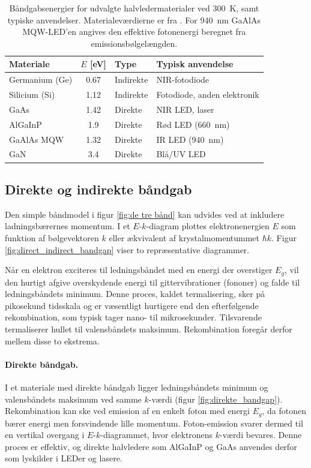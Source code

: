 \begin{table}[h]
\centering
\caption{Båndgabsenergier for udvalgte halvledermaterialer ved 
\SI{300}{K}, samt typiske anvendelser. Materialeværdierne er fra 
\cite[Tabel~16.3-1]{Saleh2007}. For \SI{940}{nm} GaAlAs MQW-LED'en angives den effektive fotonenergi beregnet fra emissionsbølgelængden.}
\label{tab:faststoffer}
\begin{tabular}{@{}lSll@{}}
\toprule
Materiale & {$E$ [eV]} & Type & Typisk anvendelse \\
\midrule
Germanium (Ge)  & 0.67 & Indirekte & NIR-fotodiode \\
Silicium (Si)   & 1.12 & Indirekte & Fotodiode, anden elektronik \\
GaAs            & 1.42 & Direkte   & NIR LED, laser \\
AlGaInP         & 1.9  & Direkte   & Rød LED (\SI{660}{nm}) \\
GaAlAs MQW      & 1.32 & Direkte   & IR LED (\SI{940}{nm}) \\
GaN             & 3.4  & Direkte   & Blå/UV LED \\
\bottomrule
\end{tabular}
\end{table}

\subsection{Direkte og indirekte båndgab}
\label{subsec:direkte_indirekte}

Den simple båndmodel i figur \ref{fig:de tre bånd} kan udvides ved at inkludere ladningsbærernes momentum. I et $E$-$k$-diagram plottes elektronenergien $E$ som funktion af bølgevektoren $k$ eller ækvivalent af krystalmomentummet $\hbar k$. Figur \ref{fig:direct_indirect_bandgap} viser to repræsentative diagrammer.

Når en elektron exciteres til ledningsbåndet med en energi der overstiger $E_g$, vil den hurtigt afgive overskydende energi til gittervibrationer (fononer) og falde til ledningsbåndets minimum. Denne proces, kaldet termalisering, sker på pikosekund tidsskala og er væsentligt hurtigere end den efterfølgende rekombination, som typisk tager nano- til mikrosekunder. Tilsvarende termaliserer hullet til valensbåndets maksimum. Rekombination foregår derfor mellem disse to ekstrema.

\paragraph{Direkte båndgab.} I et materiale med direkte båndgab ligger ledningsbåndets minimum og valensbåndets maksimum ved samme $k$-værdi (figur \ref{fig:direkte_bandgap}). Rekombination kan ske ved emission af en enkelt foton med energi $E_g$, da fotonen bærer energi men forsvindende lille momentum. Foton-emission svarer dermed til en vertikal overgang i $E$-$k$-diagrammet, hvor elektronens $k$-værdi bevares. Denne proces er effektiv, og 
direkte halvledere som AlGaInP og GaAs anvendes derfor som 
lyskilder i LEDer og lasere.

